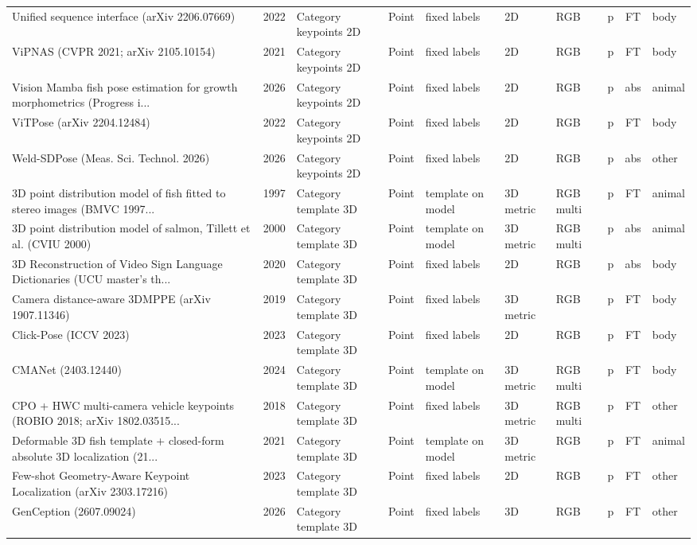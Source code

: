{\begin{landscape}
\begin{longtable}{@{}p{4.6cm}rp{2.0cm}lllllcl@{}}
Unified sequence interface (arXiv 2206.07669) & 2022 & Category keypoints 2D & Point & fixed labels & 2D & RGB & p & FT & body \\
ViPNAS (CVPR 2021; arXiv 2105.10154) & 2021 & Category keypoints 2D & Point & fixed labels & 2D & RGB & p & FT & body \\
Vision Mamba fish pose estimation for growth morphometrics (Progress i... & 2026 & Category keypoints 2D & Point & fixed labels & 2D & RGB & p & abs & animal \\
ViTPose (arXiv 2204.12484) & 2022 & Category keypoints 2D & Point & fixed labels & 2D & RGB & p & FT & body \\
Weld-SDPose (Meas. Sci. Technol. 2026) & 2026 & Category keypoints 2D & Point & fixed labels & 2D & RGB & p & abs & other \\
3D point distribution model of fish fitted to stereo images (BMVC 1997... & 1997 & Category template 3D & Point & template on model & 3D metric & RGB multi & p & FT & animal \\
3D point distribution model of salmon, Tillett et al. (CVIU 2000) & 2000 & Category template 3D & Point & template on model & 3D metric & RGB multi & p & abs & animal \\
3D Reconstruction of Video Sign Language Dictionaries (UCU master's th... & 2020 & Category template 3D & Point & fixed labels & 2D & RGB & p & abs & body \\
Camera distance-aware 3DMPPE (arXiv 1907.11346) & 2019 & Category template 3D & Point & fixed labels & 3D metric & RGB & p & FT & body \\
Click-Pose (ICCV 2023) & 2023 & Category template 3D & Point & fixed labels & 2D & RGB & p & FT & body \\
CMANet (2403.12440) & 2024 & Category template 3D & Point & template on model & 3D metric & RGB multi & p & FT & body \\
CPO + HWC multi-camera vehicle keypoints (ROBIO 2018; arXiv 1802.03515... & 2018 & Category template 3D & Point & fixed labels & 3D metric & RGB multi & p & FT & other \\
Deformable 3D fish template + closed-form absolute 3D localization (21... & 2021 & Category template 3D & Point & template on model & 3D metric & RGB & p & FT & animal \\
Few-shot Geometry-Aware Keypoint Localization (arXiv 2303.17216) & 2023 & Category template 3D & Point & fixed labels & 2D & RGB & p & FT & other \\
GenCeption (2607.09024) & 2026 & Category template 3D & Point & fixed labels & 3D & RGB & p & FT & other \\

\end{longtable}
\end{landscape}}
